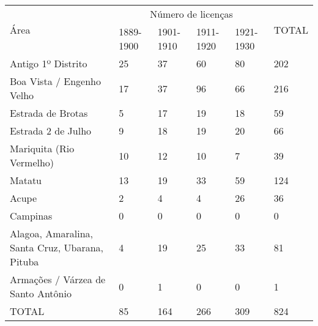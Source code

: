 \begin{table}[!htp]
{
\begin{tiny}
\begin{tabular}{llllll}
\toprule
\multirow{2}{*}{Área}	& \multicolumn{4}{c}{Número de licenças}	& \multirow{2}{*}{TOTAL}\\
\cline{2-5}
	&1889-1900	&1901-1910	&1911-1920	&1921-1930	& \\
\midrule
\midrule
Antigo 1º Distrito	&25	&37	&60	&80	&202\\
Boa Vista / Engenho Velho	&17	&37	&96	&66	&216\\
Estrada de Brotas	&5	&17	&19	&18	&59\\
Estrada 2 de Julho	&9	&18	&19	&20	&66\\
Mariquita (Rio Vermelho)	&10	&12	&10	&7	&39\\
Matatu	&13	&19	&33	&59	&124\\
Acupe	&2	&4	&4	&26	&36\\
Campinas	&0	&0	&0	&0	&0\\
Alagoa, Amaralina, Santa Cruz, Ubarana, Pituba	&4	&19	&25	&33	&81\\
Armações / Várzea de Santo Antônio	&0	&1	&0	&0	&1\\
\midrule
TOTAL	&85	&164	&266	&309	&824\\
\bottomrule
\end{tabular} 
\end{tiny}
}
{}
\end{table}
